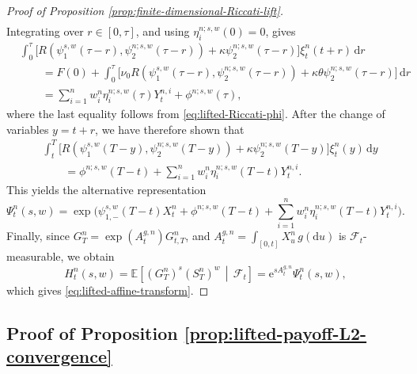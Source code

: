 \documentclass[10pt,a4paper,reqno]{amsart}
\theoremstyle{plain}
\theoremstyle{definition}
\theoremstyle{remark}
\theoremstyle{example}
\begin{document}
\begin{proof}[Proof of Proposition \ref{prop:finite-dimensional-Riccati-lift}]
\begin{align*}
\end{align*}
Integrating over $r\in[0,\tau]$, and using $\eta_i^{n;s,w}(0)=0$, gives
\begin{align*}
&\int_0^\tau \Bigg[ R\left( \psi_1^{s,w}(\tau-r), \psi_2^{n;s,w}(\tau-r) \right) + \kappa\psi_2^{n;s,w}(\tau-r) \Bigg] \xi_t^n(t+r)\,\mathrm dr 
\\ &\qquad = F(0) + \int_0^\tau \Bigg[ \nu_0 R\left( \psi_1^{s,w}(\tau-r), \psi_2^{n;s,w}(\tau-r) \right) + \kappa\theta \psi_2^{n;s,w}(\tau-r) \Bigg]\,\mathrm dr 
\\ &\qquad = \sum_{i=1}^n w_i^n \eta_i^{n;s,w}(\tau)Y_t^{n,i} + \phi^{n;s,w}(\tau),
\end{align*}
where the last equality follows from \eqref{eq:lifted-Riccati-phi}. After the change of variables
$y=t+r$, we have therefore shown that 
\begin{align*}
&\int_t^T \Bigg[ R\left( \psi_1^{s,w}(T-y), \psi_2^{n;s,w}(T-y) \right) + \kappa\psi_2^{n;s,w}(T-y) \Bigg] \xi_t^n(y)\,\mathrm dy \nonumber
\\ &\qquad = \phi^{n;s,w}(T-t) + \sum_{i=1}^n w_i^n \eta_i^{n;s,w}(T-t)Y_t^{n,i}.
\end{align*}
This yields the alternative representation
\[
 \Psi_t^n(s,w) = \exp\Bigg( \psi_{1,-}^{s,w}(T-t)X_t^n + \phi^{n;s,w}(T-t) + \sum_{i=1}^n w_i^n \eta_i^{n;s,w}(T-t)Y_t^{n,i} \Bigg).
\]
Finally, since $G_T^n = \exp\left(A_t^{g,n}\right)G_{t,T}^n$, and $A_t^{g,n} =  \int_{[0,t]} X_u^n\,g(\mathrm du)$ is $\mathcal F_t$-measurable, we obtain 
\[
    H_t^n(s,w) = \mathbb E\left[ (G_T^n)^s(S_T^n)^w \,\middle|\, \mathcal F_t \right] = \mathrm e^{sA_t^{g,n}}\Psi_t^n(s,w),
\]
which gives \eqref{eq:lifted-affine-transform}.
\end{proof}



\subsection{Proof of Proposition \ref{prop:lifted-payoff-L2-convergence}}\label{sec:proof-lifted-payoff-L2-convergence}
\end{document}
